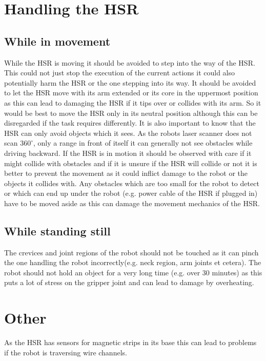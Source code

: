 \documentclass[main.tex]{subfiles}
\begin{document}
	\section{Handling the HSR}
	\subsection{While in movement}
	While the HSR is moving it should be avoided to step into the way of the HSR. This could not just stop the execution of the current actions it could also potentially harm the HSR or the one stepping into its way.
	It should be avoided to let the HSR move with its arm extended or its core in the uppermost position as this can lead to damaging the HSR if it tips over or collides with its arm. So it would be best to move the HSR only in its neutral position although this can be disregarded if the task requires differently.
	It is also important to know that the HSR can only avoid objects which it sees. As the robots laser scanner does not scan $360^\circ$, only a range in front of itself it can generally not see obstacles while driving backward.
	If the HSR is in motion it should be observed with care if it might collide with obstacles and if it is unsure if the HSR will collide or not it is better to prevent the movement as it could inflict damage to the robot or the objects it collides with.
	Any obstacles which are too small for the robot to detect or which can end up under the robot (e.g. power cable of the HSR if plugged in) have to be moved aside as this can damage the movement mechanics of the HSR.
	\subsection{While standing still}
	The crevices and joint regions of the robot should not be touched as it can pinch the one handling the robot incorrectly(e.g. neck region, arm joints et cetera).
	The robot should not hold an object for a very long time (e.g. over 30 minutes) as this puts a lot of stress on the gripper joint and can lead to damage by overheating.
	\section{Other}
	As the HSR has sensors for magnetic strips in its base this can lead to problems if the robot is traversing wire channels.
\end{document}
